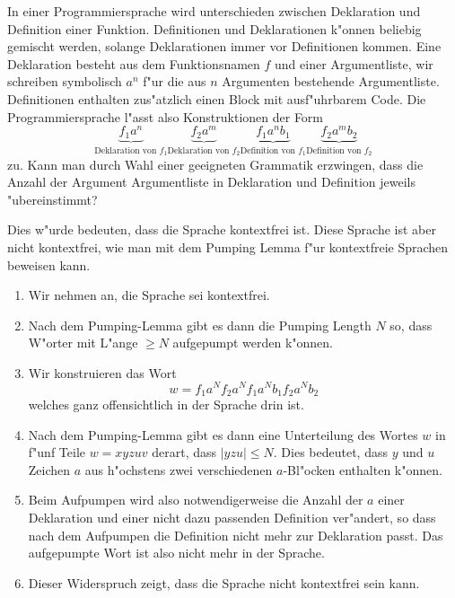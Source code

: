 In einer Programmiersprache wird unterschieden zwischen Deklaration
und Definition einer Funktion.
Definitionen und Deklarationen k"onnen beliebig gemischt werden,
solange Deklarationen immer vor Definitionen kommen.
Eine Deklaration besteht aus dem Funktionsnamen $f$ und einer Argumentliste,
wir schreiben symbolisch $a^n$  f"ur die aus $n$ Argumenten bestehende
Argumentliste.
Definitionen enthalten zus"atzlich einen Block mit ausf"uhrbarem Code.
Die Programmiersprache l"asst also Konstruktionen der Form
\[
\underbrace{f_1a^n}_{\text{Deklaration von $f_1$}}
\underbrace{f_2a^m}_{\text{Deklaration von $f_2$}}
\underbrace{f_1a^nb_1}_{\text{Definition von $f_1$}}
\underbrace{f_2a^m b_2}_{\text{Definition von $f_2$}}
\]
zu.
Kann man durch Wahl einer geeigneten Grammatik erzwingen, dass die
Anzahl der Argument Argumentliste in Deklaration und Definition jeweils 
"ubereinstimmt?




\begin{loesung}
Dies w"urde bedeuten, dass die Sprache kontextfrei ist.
Diese Sprache ist aber nicht kontextfrei, wie man mit dem Pumping Lemma
f"ur kontextfreie Sprachen beweisen kann.
\begin{enumerate}
\item
Wir nehmen an, die Sprache sei kontextfrei.
\item
Nach dem Pumping-Lemma gibt es dann die Pumping Length $N$ so,
dass W"orter mit L"ange $\ge N$ aufgepumpt werden k"onnen.
\item
Wir konstruieren das Wort
\[
w=f_1a^N f_2a^N f_1a^Nb_1f_2a^Nb_2
\]
welches ganz offensichtlich in der Sprache drin ist.
\item
Nach dem Pumping-Lemma gibt es dann eine Unterteilung des Wortes $w$ in
f"unf Teile $w=xyzuv$ derart, dass $|yzu|\le N$.
Dies bedeutet, dass $y$ und $u$ Zeichen $a$ aus h"ochstens zwei verschiedenen
$a$-Bl"ocken enthalten k"onnen.
\item
Beim Aufpumpen wird also notwendigerweise die Anzahl der $a$ einer
Deklaration und einer nicht dazu passenden Definition ver"andert,
so dass nach dem Aufpumpen die Definition nicht mehr zur Deklaration 
passt.
Das aufgepumpte Wort ist also nicht mehr in der Sprache.
\item
Dieser Widerspruch zeigt, dass die Sprache nicht kontextfrei sein kann.
\qedhere
\end{enumerate}
\end{loesung}

\begin{bewertung}
\end{bewertung}

